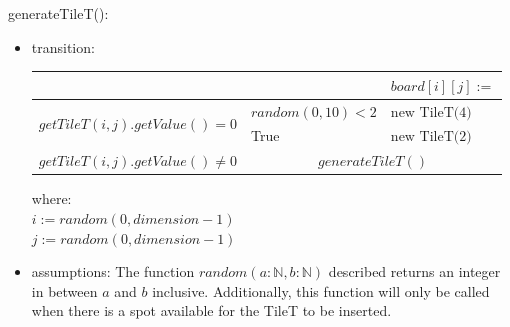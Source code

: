 \documentclass[12pt]{article}
\begin{document}
\noindent generateTileT():
\begin{itemize}
  \item transition:

        \begin{tabular}{|l|l|l|}
          \hline
                                                          &                                        & $board[i][j] :=$      \\
          \hline
          \multirow{2}{*}{$getTileT(i,j).getValue() = 0$} & $random(0, 10) < 2$                    & $\text{new TileT(4)}$ \\
          \cline{2-3}
                                                          & True                                   & $\text{new TileT(2)}$ \\
          \hline
          $getTileT(i,j).getValue() \ne 0$                & \multicolumn{2}{c|}{$generateTileT()$}                         \\
          \hline
        \end{tabular}

        where: \\
        $i := random(0 ,dimension - 1)$ \\
        $j := random(0 ,dimension - 1)$

  \item assumptions: The function $random(a: \mathbb{N}, b: \mathbb{N})$ described returns an integer in between $a$ and $b$ inclusive. Additionally, this function will only be called when there is a spot available for the TileT to be inserted.
\end{itemize}
\end{document}
